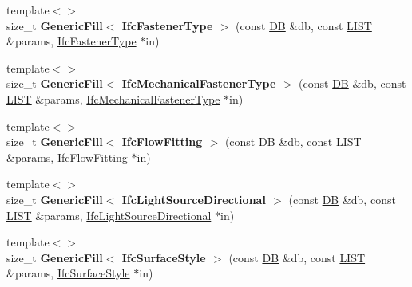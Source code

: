 \begin{DoxyCompactItemize}
\item 
\hypertarget{namespace_assimp_1_1_s_t_e_p_ad1afe89ee100cf578c445fa934c758bd}{{\footnotesize template$<$$>$ }\\size\+\_\+t {\bfseries Generic\+Fill$<$ Ifc\+Fastener\+Type $>$} (const \hyperlink{class_assimp_1_1_s_t_e_p_1_1_d_b}{D\+B} \&db, const \hyperlink{class_assimp_1_1_s_t_e_p_1_1_e_x_p_r_e_s_s_1_1_l_i_s_t}{L\+I\+S\+T} \&params, \hyperlink{struct_assimp_1_1_i_f_c_1_1_ifc_fastener_type}{Ifc\+Fastener\+Type} $\ast$in)}\label{namespace_assimp_1_1_s_t_e_p_ad1afe89ee100cf578c445fa934c758bd}

\item 
\hypertarget{namespace_assimp_1_1_s_t_e_p_a0a2fdbcf4b0fd66aef585d940280d411}{{\footnotesize template$<$$>$ }\\size\+\_\+t {\bfseries Generic\+Fill$<$ Ifc\+Mechanical\+Fastener\+Type $>$} (const \hyperlink{class_assimp_1_1_s_t_e_p_1_1_d_b}{D\+B} \&db, const \hyperlink{class_assimp_1_1_s_t_e_p_1_1_e_x_p_r_e_s_s_1_1_l_i_s_t}{L\+I\+S\+T} \&params, \hyperlink{struct_assimp_1_1_i_f_c_1_1_ifc_mechanical_fastener_type}{Ifc\+Mechanical\+Fastener\+Type} $\ast$in)}\label{namespace_assimp_1_1_s_t_e_p_a0a2fdbcf4b0fd66aef585d940280d411}

\item 
\hypertarget{namespace_assimp_1_1_s_t_e_p_aabc7155d8b9a8c480fd394ba44aa9f29}{{\footnotesize template$<$$>$ }\\size\+\_\+t {\bfseries Generic\+Fill$<$ Ifc\+Flow\+Fitting $>$} (const \hyperlink{class_assimp_1_1_s_t_e_p_1_1_d_b}{D\+B} \&db, const \hyperlink{class_assimp_1_1_s_t_e_p_1_1_e_x_p_r_e_s_s_1_1_l_i_s_t}{L\+I\+S\+T} \&params, \hyperlink{struct_assimp_1_1_i_f_c_1_1_ifc_flow_fitting}{Ifc\+Flow\+Fitting} $\ast$in)}\label{namespace_assimp_1_1_s_t_e_p_aabc7155d8b9a8c480fd394ba44aa9f29}

\item 
\hypertarget{namespace_assimp_1_1_s_t_e_p_a4bd9eb1ec90466518485d97a0a31b735}{{\footnotesize template$<$$>$ }\\size\+\_\+t {\bfseries Generic\+Fill$<$ Ifc\+Light\+Source\+Directional $>$} (const \hyperlink{class_assimp_1_1_s_t_e_p_1_1_d_b}{D\+B} \&db, const \hyperlink{class_assimp_1_1_s_t_e_p_1_1_e_x_p_r_e_s_s_1_1_l_i_s_t}{L\+I\+S\+T} \&params, \hyperlink{struct_assimp_1_1_i_f_c_1_1_ifc_light_source_directional}{Ifc\+Light\+Source\+Directional} $\ast$in)}\label{namespace_assimp_1_1_s_t_e_p_a4bd9eb1ec90466518485d97a0a31b735}

\item 
\hypertarget{namespace_assimp_1_1_s_t_e_p_a6fbb0cc82baf58db8964ee16f094f50b}{{\footnotesize template$<$$>$ }\\size\+\_\+t {\bfseries Generic\+Fill$<$ Ifc\+Surface\+Style $>$} (const \hyperlink{class_assimp_1_1_s_t_e_p_1_1_d_b}{D\+B} \&db, const \hyperlink{class_assimp_1_1_s_t_e_p_1_1_e_x_p_r_e_s_s_1_1_l_i_s_t}{L\+I\+S\+T} \&params, \hyperlink{struct_assimp_1_1_i_f_c_1_1_ifc_surface_style}{Ifc\+Surface\+Style} $\ast$in)}\label{namespace_assimp_1_1_s_t_e_p_a6fbb0cc82baf58db8964ee16f094f50b}


\end{DoxyCompactItemize}
